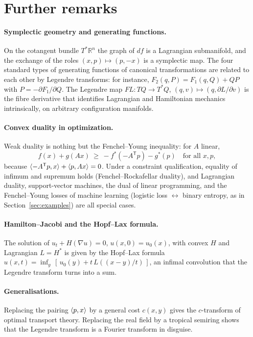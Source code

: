 \section{Further remarks}\label{sec:remarks}

\paragraph{Symplectic geometry and generating functions.}
On the cotangent bundle $T^*\mathbb{R}^n$ the graph of $d f$ is a Lagrangian
submanifold, and the exchange of the roles $(x,p)\mapsto(p,-x)$ is a
symplectic map.  The four standard types of generating functions of canonical
transformations are related to each other by Legendre transforms: for
instance, $F_2(q,P)=F_1(q,Q)+QP$ with $P=-\partial F_1/\partial Q$.  The
Legendre map $FL\colon TQ\to T^*Q$, $(q,v)\mapsto(q,\partial L/\partial v)$ is
the fibre derivative that identifies Lagrangian and Hamiltonian mechanics
intrinsically, on arbitrary configuration manifolds.

\paragraph{Convex duality in optimization.}
Weak duality is nothing but the Fenchel--Young inequality: for $A$ linear,
\[
  f(x)+g(Ax)\ \ge\ -f^*(-A^{\mathsf T}p)-g^*(p)\quad\text{for all }x,p,
\]
because $\langle -A^{\mathsf T}p,x\rangle+\langle p,Ax\rangle=0$.  Under a constraint
qualification, equality of infimum and supremum holds (Fenchel--Rockafellar
duality), and Lagrangian duality, support-vector machines, the dual of linear
programming, and the Fenchel--Young losses of machine learning
(logistic loss $\leftrightarrow$ binary entropy, as in Section~\ref{sec:examples})
are all special cases.

\paragraph{Hamilton--Jacobi and the Hopf--Lax formula.}
The solution of $u_t+H(\nabla u)=0$, $u(x,0)=u_0(x)$, with convex
$H$ and Lagrangian $L=H^*$ is given by the Hopf--Lax formula
$u(x,t)=\inf_y\,[\,u_0(y)+t\,L((x-y)/t)\,]$, an infimal convolution that the
Legendre transform turns into a sum.

\paragraph{Generalisations.}
Replacing the pairing $\langle p,x\rangle$ by a general cost $c(x,y)$ gives the
$c$-transform of optimal transport theory.  Replacing the real field by a
tropical semiring shows that the Legendre transform is a Fourier transform
in disguise.
